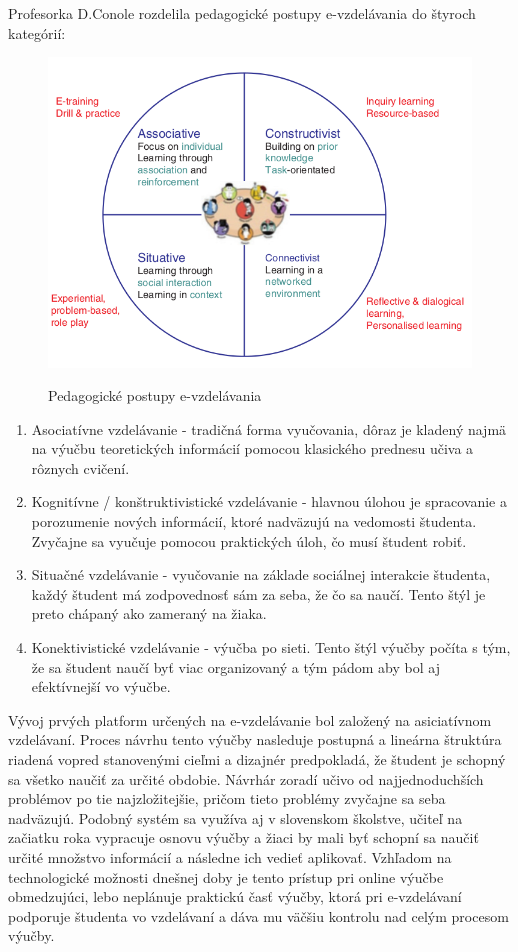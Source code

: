 \documentclass[10pt,slovak,a4paper]{article}
\begin{document}
	Profesorka D.Conole rozdelila pedagogické postupy e-vzdelávania do štyroch kategórií\cite{conoleBook}:

	\begin{figure}
		\centering
		\includegraphics[width = \textwidth]{Obrazky/Pedagogicke postupy.png}
		\caption{Pedagogické postupy e-vzdelávania}
		\label{obrazok-pedagPostupy}
		\cite{pedagPostupy}
	\end{figure}
	
	\begin{enumerate}
		\item Asociatívne vzdelávanie - tradičná forma vyučovania, dôraz je kladený najmä na výučbu teoretických informácií pomocou klasického prednesu učiva a rôznych cvičení.
		\item Kognitívne / konštruktivistické vzdelávanie - hlavnou úlohou je spracovanie a porozumenie nových informácií, ktoré nadväzujú na vedomosti študenta. Zvyčajne sa vyučuje pomocou praktických úloh, čo musí študent robiť.
		\item Situačné vzdelávanie - vyučovanie na základe sociálnej interakcie študenta, každý študent má zodpovednosť sám za seba, že čo sa naučí. Tento štýl je preto chápaný ako zameraný na žiaka.
		\item Konektivistické vzdelávanie - výučba po sieti. Tento štýl výučby počíta s tým, že sa študent naučí byť viac organizovaný a tým pádom aby bol aj efektívnejší vo výučbe. 
	\end{enumerate}

	Vývoj prvých platform určených na e-vzdelávanie bol založený na asiciatívnom vzdelávaní. Proces návrhu tento výučby nasleduje postupná a lineárna štruktúra riadená vopred stanovenými cieľmi a dizajnér predpokladá, že študent je schopný sa všetko naučiť za určité obdobie. Návrhár zoradí učivo od najjednoduchších problémov po tie najzložitejšie, pričom tieto problémy zvyčajne sa seba nadväzujú. Podobný systém sa využíva aj v slovenskom školstve, učiteľ na začiatku roka vypracuje osnovu výučby a žiaci by mali byť schopní sa naučiť určité množstvo informácií a následne ich vedieť aplikovať. Vzhľadom na technologické možnosti dnešnej doby je tento prístup pri online výučbe obmedzujúci, lebo neplánuje praktickú časť výučby, ktorá pri e-vzdelávaní podporuje študenta vo vzdelávaní a dáva mu väčšiu kontrolu nad  celým procesom výučby.
	\cite{main}
\end{document}
